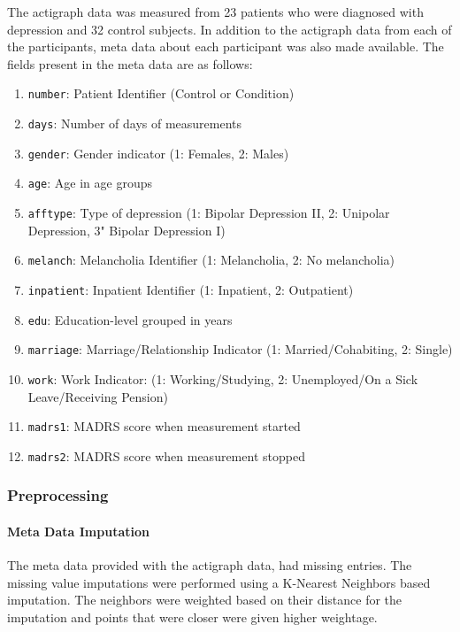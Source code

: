 \documentclass[11pt,a4paper]{article}
\newcommand{\noi}{\noindent}
\begin{document}
\noi
The actigraph data was measured from 23 patients who were diagnosed with depression and 32 control subjects. In addition to the actigraph data from each of the participants, meta data about each participant was also made available. The fields present in the meta data are as follows:
\begin{enumerate}
	\itemsep0em
	\item \texttt{number}: Patient Identifier (Control or Condition)
	\item \texttt{days}: Number of days of measurements
	\item \texttt{gender}: Gender indicator (1: Females, 2: Males)
	\item \texttt{age}: Age in age groups
	\item \texttt{afftype}: Type of depression (1: Bipolar Depression II, 2: Unipolar Depression, 3" Bipolar 
	Depression I)
	\item \texttt{melanch}: Melancholia Identifier (1: Melancholia, 2: No melancholia)
	\item \texttt{inpatient}: Inpatient Identifier (1: Inpatient, 2: Outpatient)
	\item \texttt{edu}: Education-level grouped in years
	\item \texttt{marriage}: Marriage/Relationship Indicator (1: Married/Cohabiting, 2: Single)
	\item \texttt{work}: Work Indicator: (1: Working/Studying, 2: Unemployed/On a Sick Leave/Receiving Pension)
	\item \texttt{madrs1}: MADRS score when measurement started
	\item \texttt{madrs2}: MADRS score when measurement stopped
\end{enumerate}

\subsubsection{Preprocessing}
\paragraph{Meta Data Imputation}
The meta data provided with the actigraph data, had missing entries. The missing value imputations were performed using a K-Nearest Neighbors based imputation. The neighbors were weighted based on their distance for the imputation and points that were closer were given higher weightage. 

\end{document}
